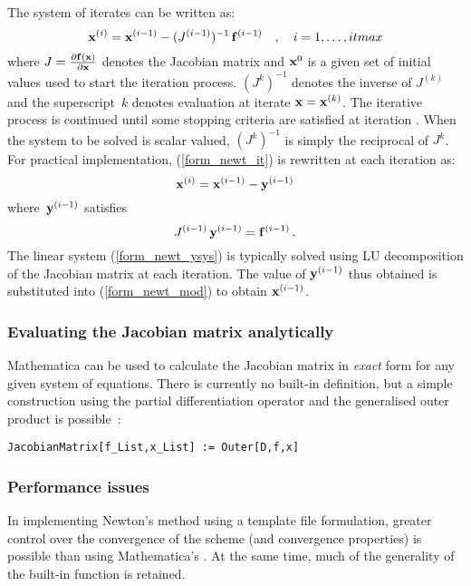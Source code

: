 \documentclass [12pt,twoside]{article}
\begin{document}
The system of iterates can be written as:
\begin{equation}\label{form_newt_it}
{\bf x}^{(i)} = {\bf x}^{(i-1)} - ({J^{(i-1)}})^{-1} \, {\bf f}^{(i-1)} \quad ,
\quad i = 1,\ldots,itmax
\end{equation}
where $J = {\partial {\bf f}({\bf x}) \over {\partial {\bf x}}}$ denotes the
Jacobian matrix and ${\bf x}^0$ is a given set of initial values used to start
the iteration process. $(J^{k})^{-1}$ denotes the inverse of $J^{(k)}$ and the
superscript~$k$ denotes evaluation at iterate ${\bf x}={\bf x}^{(k)}$. The
iterative process is continued until some stopping criteria are satisfied at
iteration
. When the system to be solved is scalar valued, $(J^{k})^{-1}$ is
simply the reciprocal of $J^{k}$. For practical implementation,
(\ref{form_newt_it}) is rewritten at each iteration as:
\begin{equation}\label{form_newt_mod}
{\bf x}^{(i)} ={\bf x}^{(i-1)} - {\bf y}^{(i-1)}
\end{equation}
where~${\bf y}^{(i-1)}$ satisfies
\begin{equation}\label{form_newt_ysys}
J^{(i-1)} \, {\bf y}^{(i-1)} = {\bf f}^{(i-1)} \,.
\end{equation}
The linear system (\ref{form_newt_ysys}) is typically
solved using LU decomposition of the Jacobian matrix at each iteration. The
value of ${\bf y}^{(i-1)}$ thus obtained is substituted into (\ref{form_newt_mod})
to obtain ${\bf x}^{(i-1)}$.

\subsubsection{Evaluating the Jacobian matrix analytically}
Mathematica can be used to calculate the Jacobian matrix in {\it exact\/}
form for any given system of equations. There is currently no built-in definition,
but a simple construction using the partial differentiation operator  and
the generalised outer product  is possible~\cite{maederbook}:
\begin{verbatim}
JacobianMatrix[f_List,x_List] := Outer[D,f,x]
\end{verbatim}

\subsubsection{Performance issues}
In implementing Newton's method using a template file formulation,
greater control over the convergence of the scheme (and convergence properties) is
possible than using Mathematica's . At the same time, much of the
generality of the built-in function is retained.
 
\end{document}
